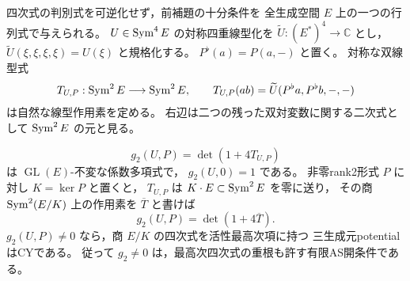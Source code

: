 四次式の判別式を可逆化せず，前補題の十分条件を
全生成空間 $E$ 上の一つの行列式で与えられる。
$U\in\operatorname{Sym}^4E$ の対称四重線型化を
$\widetilde U:(E^*)^4\to\mathbb C$ とし，
$\widetilde U(\xi,\xi,\xi,\xi)=U(\xi)$ と規格化する。
$P^\flat(a)=P(a,-)$ と置く。
対称な双線型式
\begin{equation}\label{eq:simultaneous-quartic-operator}
 T_{U,P}:\operatorname{Sym}^2E\longrightarrow\operatorname{Sym}^2E,\qquad
 T_{U,P}(ab)=\widetilde U(P^\flat a,P^\flat b,-,-)
\end{equation}
は自然な線型作用素を定める。
右辺は二つの残った双対変数に関する二次式として $\operatorname{Sym}^2E$ の元と見る。

\begin{lemma}[明示的な行列式によるAS十分条件]
\label{lem:simultaneous-explicit-as-determinant}
\begin{equation}\label{eq:simultaneous-degree-two-open}
 g_2(U,P)=\det(1+4T_{U,P})
\end{equation}
は $\operatorname{GL}(E)$-不変な係数多項式で，
$g_2(U,0)=1$ である。
非零rank2形式 $P$ に対し $K=\ker P$ と置くと，
$T_{U,P}$ は $K\cdot E\subset\operatorname{Sym}^2E$ を零に送り，
その商 $\operatorname{Sym}^2(E/K)$ 上の作用素を $\overline T$ と書けば
\[
 g_2(U,P)=\det(1+4\overline T).
\]
$g_2(U,P)\ne0$ なら，商 $E/K$ の四次式を活性最高次項に持つ
三生成元potentialはCYである。
従って $g_2\ne0$ は，最高次四次式の重根も許す有限AS開条件である。
\end{lemma}
